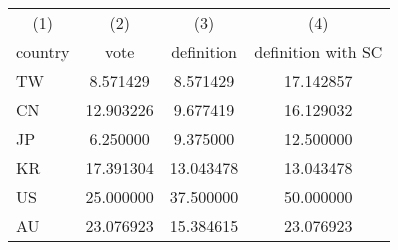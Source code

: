 {
\def\sym#1{\ifmmode^{#1}\else\(^{#1}\)\fi}
\begin{tabular}{l c c c}
\hline\hline

\multicolumn{1}{c}{(1)}
&\multicolumn{1}{c}{(2)}
&\multicolumn{1}{c}{(3)}
&\multicolumn{1}{c}{(4)}
\\

\multicolumn{1}{c}{country}
&\multicolumn{1}{c}{vote}
&\multicolumn{1}{c}{definition}
&\multicolumn{1}{c}{definition with SC}
\\
\hline
TW & 8.571429 & 8.571429 & 17.142857 \\
CN & 12.903226 & 9.677419 & 16.129032 \\
JP & 6.250000 & 9.375000 & 12.500000 \\
KR & 17.391304 & 13.043478 & 13.043478 \\
US & 25.000000 & 37.500000 & 50.000000 \\
AU & 23.076923 & 15.384615 & 23.076923 \\
\hline\hline
\end{tabular}
}
